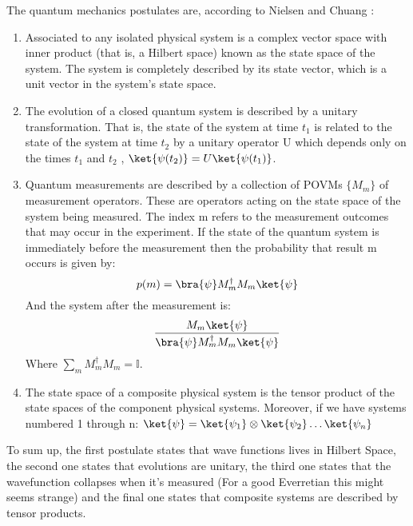 The quantum mechanics postulates are, according to Nielsen and Chuang \cite{nielsen_chuang_2010}: 
\begin{enumerate}
    \item Associated to any isolated physical system is a complex vector space with inner product (that is, a Hilbert space) known as the state space of the system. The system is completely described by its state vector, which is a unit vector in the system’s state space.
    \item The evolution of a closed quantum system is described by a unitary transformation. That is, the state \ket{\psi} of the system at time $t_1$ is related to the state \ket{\psi}  of the system at time $t_2$ by a unitary operator U which depends only on the times $t_1$ and $t_2$ , $\ket{\psi(t_2)} = U \ket{\psi(t_1)}$.
    \item Quantum measurements are described by a collection of POVMs $\{M_m\}$ of measurement operators. These are operators acting on the state space of the system being measured. The index m refers to the measurement outcomes  that  may occur in the experiment. If the state of the quantum system is \ket{\psi} immediately before the measurement then the probability that result m occurs  is given by:
    \begin{equation}
        p(m) = \bra{\psi} M_m^{\dagger} M_m \ket{\psi}
    \end{equation}
    And the system after the measurement is:
    \begin{equation}
        \frac{M_m \ket{\psi}}{\bra{\psi} M_m^{\dagger} M_m \ket{\psi}}
    \end{equation}
    Where $\sum_m M_m^{\dagger} M_m = \mathbb{I}$.
    
    \item The state space of a composite physical system is the tensor product of the state spaces of the component physical systems. Moreover, if we have systems numbered 1 through n: $\ket{\psi} = \ket{\psi_1} \otimes \ket{\psi_2} \dots \ket{\psi_n}$
\end{enumerate}

To sum up, the first postulate states that wave functions lives in Hilbert Space, the second one states that evolutions are unitary, the third one states that the wavefunction collapses when it's measured (For a good Everretian this might seems strange) and the final one states that composite systems are described by tensor products.